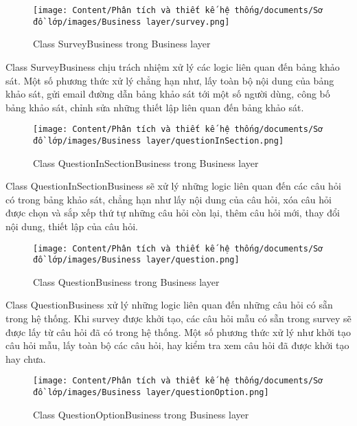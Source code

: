 \begin{figure}[H]
    \centering
    \texttt{[image: Content/Phân tích và thiết kế hệ thống/documents/Sơ đồ lớp/images/Business layer/survey.png]}
    \vspace{0.5cm}
    \caption{Class SurveyBusiness trong Business layer}
    \label{fig:Class SurveyBusiness trong Business layer}
\end{figure}
\par
Class SurveyBusiness chịu trách nhiệm xử lý các logic liên quan đến bảng khảo sát. Một số phương thức xử lý chẳng hạn như, 
lấy toàn bộ nội dung của bảng khảo sát, gửi email đường dẫn bảng khảo sát tới một số người dùng, công bố bảng khảo sát, chỉnh sửa những thiết lập liên quan đến bảng khảo sát.
\begin{figure}[H]
    \centering
    \texttt{[image: Content/Phân tích và thiết kế hệ thống/documents/Sơ đồ lớp/images/Business layer/questionInSection.png]}
    \vspace{0.5cm}
    \caption{Class QuestionInSectionBusiness trong Business layer}
    \label{fig:Class QuestionInSectionBusiness trong Business layer}
\end{figure}
\par
Class QuestionInSectionBusiness sẽ xử lý những logic liên quan đến các câu hỏi có trong bảng khảo sát, chẳng hạn như lấy nội dung của câu hỏi, 
xóa câu hỏi được chọn và sắp xếp thứ tự những câu hỏi còn lại, thêm câu hỏi mới, thay đổi nội dung, thiết lập của câu hỏi.
\begin{figure}[H]
    \centering
    \texttt{[image: Content/Phân tích và thiết kế hệ thống/documents/Sơ đồ lớp/images/Business layer/question.png]}
    \vspace{0.5cm}
    \caption{Class QuestionBusiness trong Business layer}
    \label{fig:Class QuestionBusiness trong Business layer}
\end{figure}
\par
Class QuestionBusiness xử lý những logic liên quan đến những câu hỏi có sẵn trong hệ thống. Khi survey được khởi tạo, các câu hỏi mẫu có sẵn 
trong survey sẽ được lấy từ câu hỏi đã có trong hệ thống. Một số phương thức xử lý như khởi tạo câu hỏi mẫu, lấy toàn bộ các câu hỏi, hay kiểm tra xem câu hỏi đã được khởi tạo hay chưa.
\begin{figure}[H]
    \centering
    \texttt{[image: Content/Phân tích và thiết kế hệ thống/documents/Sơ đồ lớp/images/Business layer/questionOption.png]}
    \vspace{0.5cm}
    \caption{Class QuestionOptionBusiness trong Business layer}
    \label{fig:Class QuestionOptionBusiness trong Business layer}
\end{figure}
